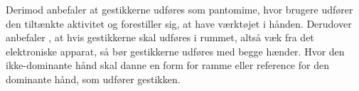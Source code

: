 Derimod anbefaler \textcite[s. 823]{PDF:UnderstandingNaturalness} at gestikkerne udføres som pantomime, hvor brugere udfører den tiltænkte aktivitet og forestiller sig, at have værktøjet i hånden. Derudover anbefaler \textcite[s. 824]{PDF:UnderstandingNaturalness}, at hvis gestikkerne skal udføres i rummet, altså væk fra det elektroniske apparat, så bør gestikkerne udføres med begge hænder. Hvor den ikke-dominante hånd skal danne en form for ramme eller reference for den dominante hånd, som udfører gestikken.      
%
